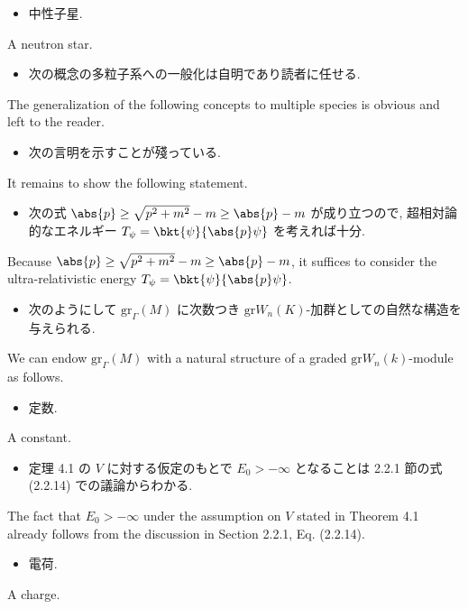 \documentclass[openany, a4paper, oneside]{jsbook}
\begin{document}
\begin{itemize}
\item 中性子星. \cite{LiebSeiringer1}
\end{itemize}
A neutron star.

\begin{itemize}
\item 次の概念の多粒子系への一般化は自明であり読者に任せる. \cite{LiebSeiringer1}
\end{itemize}
The generalization of the following concepts to multiple species is obvious and left to the reader.

\begin{itemize}
\item 次の言明を示すことが殘っている.
\end{itemize}
It remains to show the following statement.

\begin{itemize}
\item 次の式 $\abs{p} \geq \sqrt{p^2 + m^2} - m \geq \abs{p} - m$ が成り立つので, 超相対論的なエネルギー
$T_{\psi} = \bkt{\psi}{\abs{p} \psi}$ を考えれば十分. \cite{LiebSeiringer1}
\end{itemize}
Because $\abs{p} \geq \sqrt{p^2 + m^2} - m \geq \abs{p} - m$, it suffices to consider
the ultra-relativistic energy $T_{\psi} = \bkt{\psi}{\abs{p} \psi}$.

\begin{itemize}
\item 次のようにして $\mathrm{gr}_{\Gamma} (M)$ に次数つき $\mathrm{gr} W_n(K)$-加群としての自然な構造を与えられる.
\end{itemize}
We can endow $\mathrm{gr}_{\Gamma} (M)$ with a natural structure of a graded $\mathrm{gr} W_n(k)$-module as follows.

\begin{itemize}
\item 定数.
\end{itemize}
A constant.

\begin{itemize}
\item 定理 4.1 の $V$ に対する仮定のもとで $E_0 > - \infty$ となることは 2.2.1 節の式 (2.2.14) での議論からわかる. \cite{LiebSeiringer1}
\end{itemize}
The fact that $E_0 > - \infty$ under the assumption on $V$ stated in Theorem 4.1 already follows from the
discussion in Section 2.2.1, Eq. (2.2.14).

\begin{itemize}
\item 電荷.
\end{itemize}
A charge.
\end{document}

